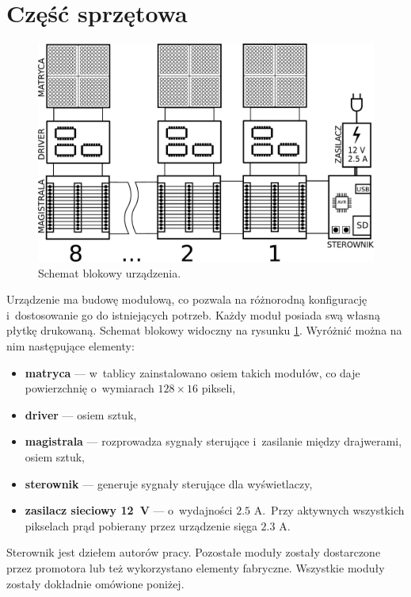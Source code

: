 \section{Część sprzętowa}

\begin{figure}[t]
    \begin{center}
       \includegraphics[width=\textwidth]{figures/blokowy.pdf}
    \end{center}

    \caption{Schemat blokowy urządzenia.}
    \label{schemat-blokowy}
\end{figure}

Urządzenie ma budowę modułową, co pozwala na różnorodną konfigurację i~dostosowanie go do istniejących potrzeb. Każdy moduł posiada swą własną płytkę drukowaną.  Schemat blokowy widoczny na rysunku \ref{schemat-blokowy}. Wyróżnić można na nim następujące elementy:
\begin{itemize}
	\item \textbf{matryca} --- w~tablicy zainstalowano osiem takich modułów, co daje powierzchnię o~wymiarach $128 \times 16$ pikseli,
	\item \textbf{driver} --- osiem sztuk,
	\item \textbf{magistrala} --- rozprowadza sygnały sterujące i~zasilanie między drajwerami, osiem sztuk,
	\item \textbf{sterownik} --- generuje sygnały sterujące dla wyświetlaczy,
	\item \textbf{zasilacz sieciowy 12~V} --- o~wydajności $2.5$ A.~Przy aktywnych wszystkich pikselach prąd pobierany przez urządzenie sięga $2.3$ A.
\end{itemize}
Sterownik jest dziełem autorów pracy. Pozostałe moduły zostały dostarczone przez promotora lub też wykorzystano elementy fabryczne. Wszystkie moduły zostały dokładnie omówione poniżej.


